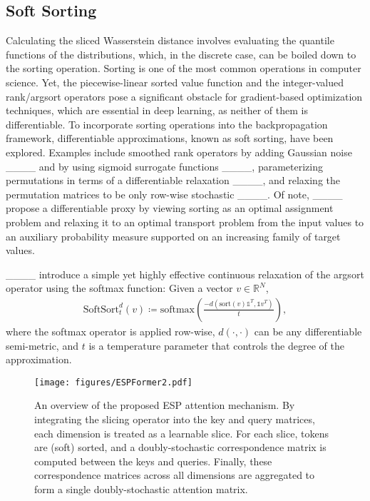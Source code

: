 \subsection{Soft Sorting}
Calculating the sliced Wasserstein distance involves evaluating the quantile functions of the distributions, which, in the discrete case, can be boiled down to the sorting operation. Sorting is one of the most common operations in computer science. Yet, the piecewise-linear sorted value function and the integer-valued rank/argsort operators pose a significant obstacle for gradient-based optimization techniques, which are essential in deep learning, as neither of them is differentiable. To incorporate sorting operations into the backpropagation framework, differentiable approximations, known as soft sorting, have been explored. Examples include smoothed rank operators by adding Gaussian noise ____ and by using sigmoid surrogate functions ____, parameterizing permutations in terms of a differentiable relaxation 
 ____, and relaxing the permutation matrices to be only row-wise stochastic ____.  Of note, ____ propose a differentiable proxy by viewing sorting as an optimal assignment problem and relaxing it to an optimal transport problem from the input values to an auxiliary probability measure supported on an increasing family of target values. 

____ introduce a simple yet highly effective continuous relaxation of the argsort operator using the softmax function: Given a vector $v\in\mathbb{R}^N$,
\begin{align}
    \text{SoftSort}_t^d(v) \coloneqq \text{softmax}\left(\frac{-d(\text{sort}(v)\mathds{1}^T, \mathds{1}v^T)}{t}\right),
    \label{eq:softsort}
\end{align}
where the softmax operator is applied row-wise, $d(\cdot, \cdot)$ can be any differentiable semi-metric, and $t$ is a temperature parameter that controls the degree of the approximation. 

\begin{figure*}[t!]
    \centering
    \texttt{[image: figures/ESPFormer2.pdf]}
    \vspace{-.15in}
    \caption{An overview of the proposed ESP attention mechanism. By integrating the slicing operator into the key and query matrices, each dimension is treated as a learnable slice. For each slice, tokens are (soft) sorted, and a doubly-stochastic correspondence matrix is computed between the keys and queries. Finally, these correspondence matrices across all dimensions are aggregated to form a single doubly-stochastic attention matrix.}
    \label{fig:teaser}
    \vspace{-.2in}
\end{figure*}